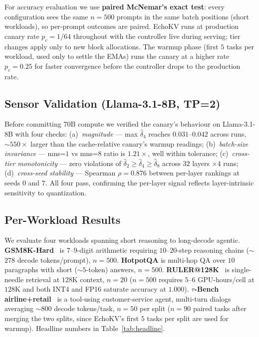 \documentclass{article}
\begin{document}
For accuracy evaluation we use \textbf{paired McNemar's exact test}: every
configuration sees the same $n{=}500$ prompts in the same batch positions
(short workloads), so per-prompt outcomes are paired. EchoKV runs at
production canary rate $p_c{=}1/64$ throughout with the controller live
during serving; tier changes apply only to new block allocations.
The warmup phase (first $5$ tasks per workload, used only to settle the
EMAs) runs the canary at a higher rate $p_c{=}0.25$ for faster convergence
before the controller drops to the production rate.

\subsection{Sensor Validation (Llama-3.1-8B, TP=2)}
\label{sec:sensor_val}

Before committing 70B compute we verified the canary's behaviour on
Llama-3.1-8B with four checks:
(a)~\emph{magnitude} --- max $\hat{\delta}_4$ reaches $0.031$--$0.042$
across runs, ${\sim}550\times$ larger than the cache-relative canary's
warmup readings; (b)~\emph{batch-size invariance} --- mns=$1$ vs mns=$8$
ratio is $1.21\times$, well within tolerance; (c)~\emph{cross-tier
monotonicity} --- zero violations of
$\hat{\delta}_2 \ge \hat{\delta}_4 \ge \hat{\delta}_8$ across $32$ layers
$\times 4$ runs; (d)~\emph{cross-seed stability} --- Spearman $\rho{=}0.876$
between per-layer rankings at seeds $0$ and $7$. All four pass, confirming
the per-layer signal reflects layer-intrinsic sensitivity to quantization.

\subsection{Per-Workload Results}
\label{sec:per_workload}

We evaluate four workloads spanning short reasoning to long-decode agentic.
\textbf{GSM8K-Hard}~\cite{gsmhard} is $7$--$9$-digit arithmetic requiring
$10$--$20$-step reasoning chains ($\sim$$278$ decode tokens/prompt),
$n{=}500$. \textbf{HotpotQA} is multi-hop QA over $10$ paragraphs with short
($\sim$$5$-token) answers, $n{=}500$. \textbf{RULER@128K}~\cite{hsieh2024ruler}
is single-needle retrieval at $128$K context, $n{=}20$ ($n{=}500$ requires
$5$--$6$ GPU-hours/cell at $128$K and both INT4 and FP16 saturate
accuracy at $1.000$). \textbf{$\tau$-Bench airline+retail}~\cite{yao2024taubench}
is a tool-using customer-service agent, multi-turn dialogs averaging
$\sim$$800$ decode tokens/task, $n{=}50$ per split ($n{=}90$ paired tasks
after merging the two splits, since EchoKV's first $5$ tasks per split are
used for warmup). Headline numbers in Table~\ref{tab:headline}.
\end{document}

